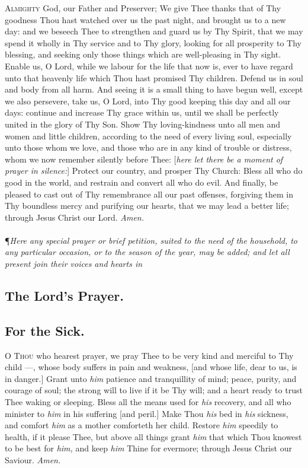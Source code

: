 \lettrine{A}{lmighty} God, our Father and Preserver; We give
Thee thanks that of Thy goodness Thou hast watched
over us the past night, and brought us to a new day: and we
beseech Thee to strengthen and guard us by Thy Spirit, that
we may spend it wholly in Thy service and to Thy glory,
looking for all prosperity to Thy blessing, and seeking
only those things which are well-pleasing in Thy sight.
Enable us, O Lord, while we labour for the life that now
is, ever to have regard unto that heavenly life which Thou
hast promised Thy children. Defend us in soul and body
from all harm. And seeing it is a small thing to have begun well, except we also persevere, take us, O Lord, into
Thy good keeping this day and all our days: continue and
increase Thy grace within us, until we shall be perfectly
united in the glory of Thy Son. Show Thy loving-kindness
unto all men and women and little children, according to
the need of every living soul, especially unto those whom
we love, and those who are in any kind of trouble or distress, whom we now remember silently before Thee:
[\textit{here let there be a moment of prayer in silence:}]
Protect our country, and prosper Thy Church: Bless all who do good in the
world, and restrain and convert all who do evil. And finally,
be pleased to cast out of Thy remembrance all our past
offenses, forgiving them in Thy boundless mercy and purifying our hearts, that we may lead a better life; through
Jesus Christ our Lord.
\textit{Amen.} \\ \\

\noindent\P\textit{Here any special prayer or brief petition, suited to the need of the household, to any particular occasion, or to the season of the
year, may be added; and let all present join their voices and
hearts in}

\subsection*{The Lord's Prayer.}

\subsection*{For the Sick.}

\lettrine{O}{ Thou} who hearest prayer, we pray Thee to be very
kind and merciful to Thy child ---, whose body
suffers in pain and weakness, [and whose life, dear to us, is
in danger.] Grant unto \textit{him} patience and tranquillity of
mind; peace, purity, and courage of soul; the strong will
to live if it be Thy will; and a heart ready to trust Thee
waking or sleeping. Bless all the means used for \textit{his} recovery, and all who minister to \textit{him} in his suffering [and
peril.] Make Thou \textit{his} bed in \textit{his} sickness, and comfort
\textit{him} as a mother comforteth her child. Restore \textit{him} speedily to health, if it please Thee, but above all things grant
\textit{him} that which Thou knowest to be best for \textit{him,} and keep
\textit{him} Thine for evermore; through Jesus Christ our Saviour.
\textit{Amen.} \\

